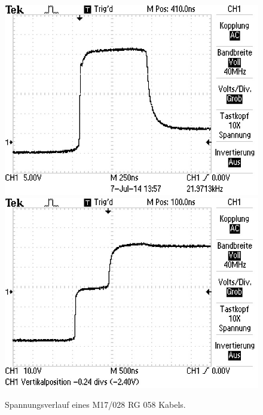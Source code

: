 \begin{figure}
\centering
	\includegraphics[width = 12cm]{data/c/ALL0002/F0002TEK.jpg}
	\includegraphics[width = 12cm]{data/c/ALL0003/F0003TEK.jpg}
	\caption{Spannungsverlauf eines M17/028 RG 058 Kabels.}
	\label{fig_zeit2}
\end{figure}
